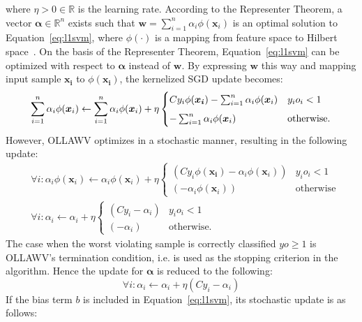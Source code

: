 \documentclass[reqno]{vcuthesis}
\newcommand{\reals}{{\mathbb{R}}}
\numberwithin{equation}{chapter}
\begin{document}
where $\eta > 0 \in \reals $ is the learning rate. According to the Representer Theorem, a vector $\bm \alpha \in \reals^n$ exists such that $\bm w = \sum_{i=1}^n \alpha_i \phi(\bm x_i)$ is an optimal solution to Equation~\ref{eq:l1svm}, where $\phi(\cdot)$ is a mapping from feature space to Hilbert space~\cite{Shalev2014}. On the basis of the Representer Theorem, Equation~\ref{eq:l1svm} can be optimized with respect to $\bm \alpha$ instead of $\bm w$. By expressing $\bm w$ this way and mapping input sample $\bm{x_i}$ to $\phi(\bm{x_i})$, the kernelized SGD update becomes:
\begin{equation*}
\centering
\sum_{i=1}^n \alpha_i \phi(\bm x_i) \leftarrow \sum_{i=1}^n \alpha_i \phi(\bm x_i) + \eta \begin{cases} 
															C y_i \phi(\bm{x_i}) - \sum_{i=1}^n \alpha_i \phi(\bm x_i) & y_i o_i < 1 \\[5pt]
															-\sum_{i=1}^n \alpha_i \phi(\bm x_i) & \text{otherwise}.
													 \end{cases}
\end{equation*}
However, OLLAWV optimizes in a stochastic manner, resulting in the following update:
\begin{align*}
&\forall i: \alpha_i \phi(\bm x_i) \leftarrow \alpha_i \phi(\bm x_i) + \eta \begin{cases} 
																													(Cy_i\phi(\bm{x_i}) - \alpha_i \phi(\bm x_i)) & y_i o_i < 1 \\
																													(- \alpha_i \phi(\bm x_i)) & \text{otherwise}
																													 \end{cases} \\							
&\forall i: \alpha_i \leftarrow \alpha_i + \eta \begin{cases} 
																(Cy_i - \alpha_i) & y_i o_i < 1 \\
																(- \alpha_i) & \text{otherwise}.
															\end{cases} 
\end{align*}
The case when the worst violating sample is correctly classified $yo \geq 1$ is OLLAWV's termination condition, i.e. is used as the stopping criterion in the algorithm. Hence the update for $\bm \alpha$ is reduced to the following:
\begin{equation}
\label{eq:alphaupdate}
\forall i: \alpha_i \leftarrow \alpha_i + \eta(Cy_i - \alpha_i)
\end{equation}
If the bias term $b$ is included in Equation~\ref{eq:l1svm}, its stochastic update is as follows:
\end{document}
